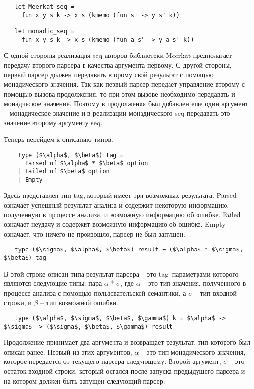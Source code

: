 \documentclass[conference]{IEEEtran}
\begin{document}
\begin{lstlisting}
   let Meerkat_seq =
     fun x y s k -> x s (kmemo (fun s' -> y s' k))
     
   let monadic_seq =
     fun x y s k -> x s (kmemo (fun a s' -> y a s' k))
\end{lstlisting}

С одной стороны реализация seq авторов библиотеки Meerkat предполагает передачу второго парсера в качества аргумента первому. С другой стороны, первый парсер должен передавать второму свой результат с помощью монадического значения. Так как первый парсер передает управление второму с помощью вызова продолжения, то при этом вызове необходимо передавать и монадческое значение. Поэтому в продолжения был добавлен еще один аргумент -- монадическое значение и в реализации монадического seq передавать это значение второму аргументу seq.

Теперь перейдем к описанию типов.

\begin{lstlisting}
    type ($\alpha$, $\beta$) tag =
      Parsed of $\alpha$ * $\beta$ option
    | Failed of $\beta$ option
    | Empty
  \end{lstlisting}
  
Здесь представлен тип tag, который имеет три возможных результата. Parsed означает успешный результат анализа и содержит некоторую информацию, полученную в процессе анализа, и возможную информацию об ошибке. Failed означает неудачу и содержит возможную информацию об ошибке. Empty означает, что ничего не произошло, парсер не был запущен. 

\begin{lstlisting}
   type ($\sigma$, $\alpha$, $\beta$) result = ($\alpha$ * $\sigma$, $\beta$) tag
  \end{lstlisting}
  
В этой строке описан типа результат парсера -- это tag, параметрами которого являются следующие типы:  пара $\alpha$ * $\sigma$, где $\alpha$ -- это тип значения, полученного в процессе анализа с помощью пользовательской семантики, а $\sigma$ -- тип входной строки, и $\beta$ -- тип возможной ошибки.

\begin{lstlisting}
   type ($\alpha$, $\sigma$, $\beta$, $\gamma$) k = $\alpha$ -> $\sigma$ -> ($\sigma$, $\beta$, $\gamma$) result
  \end{lstlisting}
  
Продолжение принимает два аргумента и возвращает результат, тип которого был описан ранее. Первый из этих аргументов, $\alpha$ -- это тип монадического значения, которое передается от текущего парсера следующему. Второй аргумент, $\sigma$ -- это остаток входной строки, который остался после запуска предыдущего парсера и на котором должен быть запущен следующий парсер.
\end{document}
